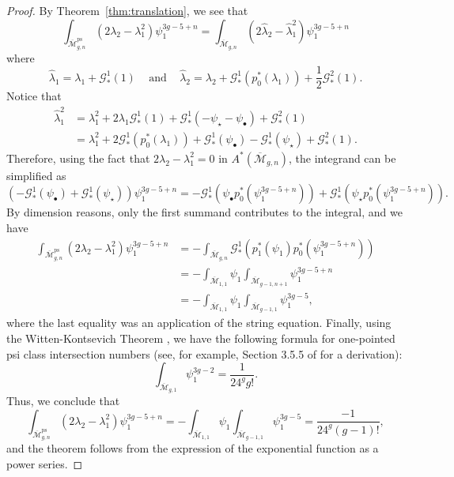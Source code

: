 \documentclass[12pt]{amsart}
\theoremstyle{definition}
\newcommand{\M}{\overline{\mathcal{M}}}
\newcommand{\ps}{\mathrm{ps}}
\newcommand{\G}{\mathcal{G}}
\numberwithin{equation}{section}
\begin{document}
\begin{proof}
By Theorem~\ref{thm:translation}, we see that
\[
\int_{\M_{g,n}^{\ps}}(2\lambda_2-\lambda_1^2)\psi_1^{3g-5+n}=\int_{\M_{g,n}}(2\hat\lambda_2-\hat\lambda_1^2)\psi_1^{3g-5+n}
\]
where
\[
\hat\lambda_1=\lambda_1+\G^1_*(1)\;\;\;\text{ and }\;\;\;\hat\lambda_2=\lambda_2+\G_*^1(p_0^*(\lambda_1))+\frac{1}{2}\G_*^2(1).
\]
Notice that
\begin{align*}
\hat\lambda_1^2&=\lambda_1^2+2\lambda_1\G^1_*(1)+\G_*^1(-\psi_{\star}-\psi_{\bullet})+\G^2_*(1)\\
&=\lambda_1^2+2\G^1_*(p_0^*(\lambda_1))+\G^1_*(\psi_\bullet)-\G^1_*(\psi_\star)+\G^2_*(1).
\end{align*}
Therefore, using the fact that $2\lambda_2-\lambda_1^2=0$ in $A^*(\M_{g,n})$, the integrand can be simplified as
\[
(-\G^1_*(\psi_{\bullet})+\G^1_*(\psi_{\star}))\psi_1^{3g-5+n}=-\G^1_*(\psi_{\bullet}p_0^*(\psi_1^{3g-5+n}))+\G^1_*(\psi_{\star}p_0^*(\psi_1^{3g-5+n})).
\]
By dimension reasons, only the first summand contributes to the integral, and we have
\begin{align*}
\int_{\M_{g,n}^{\ps}}(2\lambda_2-\lambda_1^2)\psi_1^{3g-5+n}&=-\int_{\M_{g,n}}\G^1_*(p_1^*(\psi_1)p_0^*(\psi_1^{3g-5+n}))\\
&=-\int_{\M_{1,1}}\psi_1\int_{\M_{g-1,n+1}}\psi_1^{3g-5+n}\\
&=-\int_{\M_{1,1}}\psi_1\int_{\M_{g-1,1}}\psi_1^{3g-5},
\end{align*}
where the last equality was an application of the string equation. Finally, using the Witten-Kontsevich Theorem \cite{Witten,Kontsevich}, we have the following formula for one-pointed psi class intersection numbers (see, for example, Section 3.5.5 of \cite{Kock} for a derivation):
\[
\int_{\M_{g,1}}\psi_1^{3g-2}=\frac{1}{24^gg!}.
\]
Thus, we conclude that
\[
\int_{\M_{g,n}^{\ps}}(2\lambda_2-\lambda_1^2)\psi_1^{3g-5+n}=-\int_{\M_{1,1}}\psi_1\int_{\M_{g-1,1}}\psi_1^{3g-5}=\frac{-1}{24^g(g-1)!},
\]
and the theorem follows from the expression of the exponential function as a power series.
\end{proof}



\end{document}
